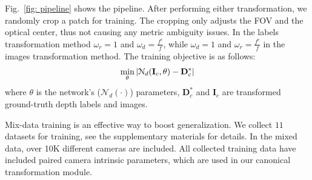 Fig.~\ref{fig: pipeline} shows the pipeline. After performing either transformation, we randomly crop a patch for training. %
The cropping only adjusts the FOV and the optical center, %
thus not causing any metric ambiguity issues. In the labels transformation method $\omega_r = 1$ and $\omega_d=\frac{f^c}{f}$, while $\omega_d = 1$ and $\omega_r=\frac{f^c}{f}$ in the images transformation method. The training objective is as follows:
\begin{equation}
    \min_{\theta}\left | \mathcal{N}_{d}(\mathbf{I}_{c}, \theta) - \mathbf{D}^{*}_{c} \right| 
\label{eq: robust metric depth}
\vspace{-0.5 em}
\end{equation}
where 
$\theta$ is the network's ($\mathcal{N}_{d}(\cdot)$) parameters, $\mathbf{D}^{*}_{c}$ and $\mathbf{I}_{c}$ are transformed ground-truth depth labels and images.




Mix-data training is an effective way to boost generalization. 
We collect $11$ datasets for training, see 
the supplementary materials for details. In the mixed data, over 10K different cameras are included. %
All collected training data have included paired camera intrinsic parameters, which are %
used in our canonical transformation module. 


